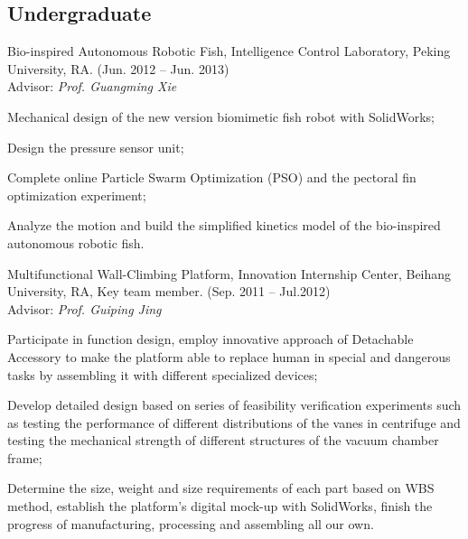 \documentclass[10pt,letterpaper]{article}
\renewenvironment{itemize}{
  \begin{list}{}{
    \setlength{\leftmargin}{1.5em}
    \setlength{\itemsep}{0.25em}
    \setlength{\parskip}{0pt}
    \setlength{\parsep}{0.25em}
  }
}{
  \end{list}
}
\begin{document}
\subsection*{Undergraduate}

\begin{itemize}
  \item Bio-inspired Autonomous Robotic Fish, Intelligence Control Laboratory, Peking University, RA. (Jun. 2012 -- Jun. 2013) \\
    Advisor: \textit{Prof. Guangming Xie}
  \begin{itemize}
    \item Mechanical design of the new version biomimetic fish robot with SolidWorks;
    \item Design the pressure sensor unit;
    \item Complete online Particle Swarm Optimization (PSO) and the pectoral fin optimization experiment;
    \item Analyze the motion and build the simplified kinetics model of the bio-inspired autonomous robotic fish.
  \end{itemize}

  \item Multifunctional Wall-Climbing Platform, Innovation Internship Center, Beihang University, RA, Key team member. (Sep. 2011 -- Jul.2012) \\
    Advisor: \textit{Prof. Guiping Jing}
  \begin{itemize}
    \item Participate in function design, employ innovative approach of Detachable Accessory to make the platform able to replace human in special and dangerous tasks by assembling it with different specialized devices;
    \item Develop detailed design based on series of feasibility verification experiments such as testing the performance of different distributions of the vanes in centrifuge and testing the mechanical strength of different structures of the vacuum chamber frame;
    \item Determine the size, weight and size requirements of each part based on WBS method, establish the platform's digital mock-up with SolidWorks, finish the progress of manufacturing, processing and assembling all our own.
  \end{itemize}


\end{itemize}
\end{document}
